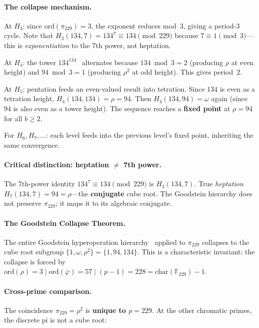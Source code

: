 \paragraph{The collapse mechanism.}
At $H_3$: since $\mathrm{ord}(\pi_{229}) = 3$, the exponent reduces mod~$3$, giving a period-$3$ cycle. Note that $H_3(134, 7) = 134^7 \equiv 134 \pmod{229}$ because $7 \equiv 1 \pmod{3}$---this is \emph{exponentiation} to the 7th power, not heptation.

At $H_4$: the tower $134^{134^{\cdots}}$ alternates because $134 \bmod 3 = 2$ (producing $\rho$ at even height) and $94 \bmod 3 = 1$ (producing $\rho^2$ at odd height). This gives period~$2$.

At $H_5$: pentation feeds an even-valued result into tetration. Since $134$ is even as a tetration height, $H_4(134, 134) = \rho = 94$. Then $H_4(134, 94) = \omega$ again (since $94$ is also even as a tower height). The sequence reaches a \textbf{fixed point} at $\rho = 94$ for all $b \geq 2$.

For $H_6, H_7, \ldots$: each level feeds into the previous level's fixed point, inheriting the same convergence.

\paragraph{Critical distinction: heptation $\neq$ 7th power.}
The 7th-power identity $134^7 \equiv 134 \pmod{229}$ is $H_3(134, 7)$. True \emph{heptation} $H_7(134, 7) = 94 = \rho$---the \textbf{conjugate} cube root. The Goodstein hierarchy does not preserve $\pi_{229}$; it maps it to its algebraic conjugate.

\paragraph{The Goodstein Collapse Theorem.}
The entire Goodstein hyperoperation hierarchy~\cite{goodstein1947, knuth1976} applied to $\pi_{229}$ collapses to the cube root subgroup $\{1, \omega, \rho^2\} = \{1, 94, 134\}$. This is a characteristic invariant: the collapse is forced by $\mathrm{ord}(\rho) = 3 \mid \mathrm{ord}(\bar\varphi) = 57 \mid (p - 1) = 228 = \mathrm{char}(\mathbb{F}_{229}) - 1$.

\paragraph{Cross-prime comparison.}
The coincidence $\pi_{229} = \rho^2$ is \textbf{unique to $p = 229$}. At the other chromatic primes, the discrete pi is not a cube root:

